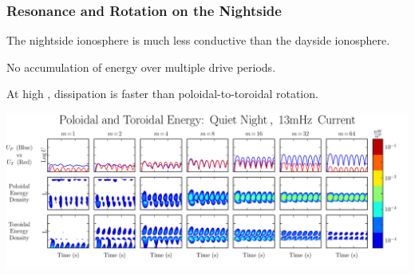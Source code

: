 \documentclass{beamer}
\begin{document}

\begin{frame}
\frametitle{Resonance and Rotation on the Nightside}

\begin{wideitemize}
\item The nightside ionosphere is much less conductive than the dayside ionosphere. 
\item No accumulation of energy over multiple drive periods. 
\item At high \azm, dissipation is faster than poloidal-to-toroidal rotation. 
\end{wideitemize}

\vfill

\includegraphics[width=\textwidth]{figures/energy_night.pdf}

\end{frame}

\end{document}
